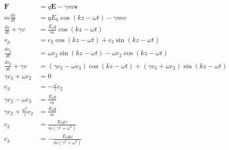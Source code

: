 \documentclass{article}
\renewcommand{\vec}[1]{\boldsymbol{\mathbf{#1}}}
\begin{document}
\begin{enumerate}
        \begin{align*}
          \vec{F}                                  & = q \vec{E} - \gamma m \vec{v}                                                                                         \\
          m \frac{d v}{d t}                        & = q E_0 \cos (k z - \omega t) - \gamma m v                                                                             \\
          \frac{d v}{d t} + \gamma v               & = \frac{E_0 q}{m} \cos (k z - \omega t)                                                                                \\
          v_p                                      & = c_2 \cos (k z - \omega t) + c_3 \sin (k z - \omega t)                                                                \\
          \frac{d v_p}{d t}                        & = \omega c_2 \sin (k z - \omega t) - \omega c_2 \cos (k z - \omega t)                                                  \\
          \frac{d v_p}{d t} + \gamma v             & = (\gamma c_2 - \omega c_3) \cos (k z - \omega t) + (\gamma c_3 + \omega c_2) \sin (k z - \omega t)                    \\
          \gamma c_3 + \omega c_2                  & = 0                                                                                                                    \\
          c_3                                      & = -\frac{\omega}{\gamma} c_2                                                                                           \\
          \gamma c_2 - \omega c_3                  & = \frac{E_0 q}{m}                                                                                                      \\
          \gamma c_2 + \frac{\omega^2}{\gamma} c_2 & = \frac{E_0 q}{m}                                                                                                      \\
          c_2                                      & = \frac{E_0 q \gamma}{m (\gamma^2 + \omega^2)}                                                                         \\
          c_3                                      & = -\frac{E_0 q \omega}{m (\gamma^2 + \omega^2)}                                                                        \\

\end{align*}
\end{enumerate}
\end{document}
